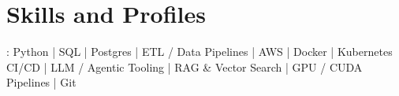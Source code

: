 \documentclass[]{jack-resume}
\begin{document}
\pagecolor{darkmodeBackground}

%
%



%
%
\begin{minipage}[t][1cm][t]{.03\textwidth}
    \hfill
\end{minipage}






\section{Skills and Profiles}
:
Python \hfill | \hfill
SQL \hfill | \hfill
Postgres \hfill | \hfill
ETL / Data Pipelines \hfill | \hfill
AWS \hfill | \hfill
Docker \hfill | \hfill
Kubernetes \\
\hspace{1.0cm} CI/CD \hfill | \hfill
LLM / Agentic Tooling \hfill | \hfill
RAG \& Vector Search \hfill | \hfill
GPU / CUDA Pipelines \hfill | \hfill
Git \\
\end{document}
